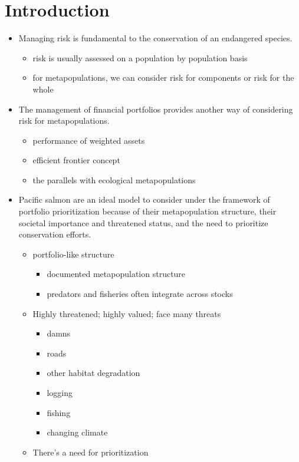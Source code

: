 \section{Introduction}

\begin{itemize}
\itemsep1pt\parskip0pt
\item
  Managing risk is fundamental to the conservation of an endangered
  species.

  \begin{itemize}
  \itemsep1pt\parskip0pt
  \item
    risk is usually assessed on a population by population basis
  \item
    for metapopulations, we can consider risk for components or risk for
    the whole
  \end{itemize}
\item
  The management of financial portfolios provides another way of
  considering risk for metapopulations.

  \begin{itemize}
  \itemsep1pt\parskip0pt
  \item
    performance of weighted assets
  \item
    efficient frontier concept
  \item
    the parallels with ecological metapopulations
  \end{itemize}
\item
  Pacific salmon are an ideal model to consider under the framework of
  portfolio prioritization because of their metapopulation structure,
  their societal importance and threatened status, and the need to
  prioritize conservation efforts.

  \begin{itemize}
  \itemsep1pt\parskip0pt
  \item
    portfolio-like structure

    \begin{itemize}
    \itemsep1pt\parskip0pt
    \item
      documented metapopulation structure
    \item
      predators and fisheries often integrate across stocks
    \end{itemize}
  \item
    Highly threatened; highly valued; face many threats

    \begin{itemize}
    \itemsep1pt\parskip0pt
    \item
      damns
    \item
      roads
    \item
      other habitat degradation
    \item
      logging
    \item
      fishing
    \item
      changing climate
    \end{itemize}
  \item
    There's a need for prioritization


\end{itemize}
\end{itemize}
